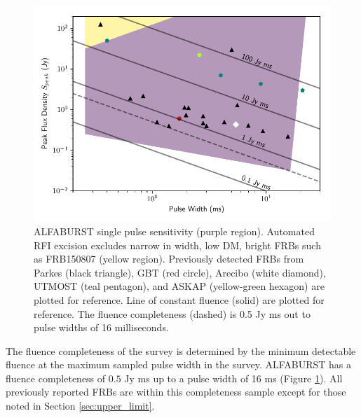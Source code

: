 \documentclass[a4paper,fleqn,usenatbib]{mnras}
\begin{document}
\begin{figure}
    \includegraphics[width=1.0\linewidth]{figures/sensitivity_range.pdf}
    \caption{ALFABURST single pulse sensitivity (purple region). Automated RFI
    excision excludes narrow in width, low DM, bright FRBs such as FRB150807
    (yellow region).  Previously detected FRBs from Parkes (black triangle), GBT
    (red circle), Arecibo (white diamond), UTMOST (teal pentagon), and ASKAP
    (yellow-green hexagon) are plotted for reference. Line of constant fluence
    (solid) are plotted for reference. The fluence completeness (dashed) is 0.5
    Jy ms out to pulse widths of 16 milliseconds.
    }
    \label{fig:sensitivity_range}
\end{figure}




The fluence completeness of the survey \citep{2015MNRAS.447.2852K} is determined
by the minimum detectable fluence at the maximum sampled pulse width in the
survey. ALFABURST has a fluence completeness of $0.5$ Jy ms up to a pulse width
of 16 ms (Figure \ref{fig:sensitivity_range}). All previously reported FRBs are
within this completeness sample except for those noted in Section
\ref{sec:upper_limit}.

\end{document}
